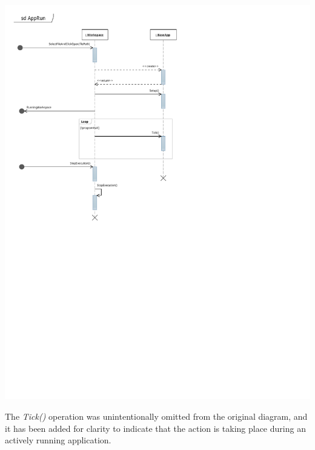 \documentclass[12pt]{article}
\begin{document}
\begin{center}
        \includegraphics[scale=1]{./pdfs/MS4Models/ReflexGame.pdf}
\end{center}

\clearpage

The \textit{Tick()} operation was unintentionally omitted from the original diagram, and it has been added for clarity to indicate that the action is taking place during an actively running application.
\end{document}
